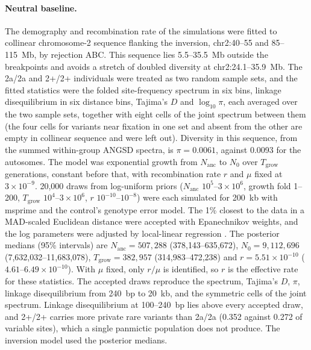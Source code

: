 \documentclass[11pt]{article}
\begin{document}
\paragraph{Neutral baseline.}
The demography and recombination rate of the simulations were fitted to collinear chromosome-2 sequence flanking the inversion, chr2:40--55 and 85--115~Mb, by rejection ABC. This sequence lies 5.5--35.5~Mb outside the breakpoints and avoids a stretch of doubled diversity at chr2:24.1--35.9~Mb. The 2a/2a and 2+/2+ individuals were treated as two random sample sets, and the fitted statistics were the folded site-frequency spectrum in six bins, linkage disequilibrium in six distance bins, Tajima's $D$ and $\log_{10}\pi$, each averaged over the two sample sets, together with eight cells of the joint spectrum between them (the four cells for variants near fixation in one set and absent from the other are empty in collinear sequence and were left out). Diversity in this sequence, from the summed within-group ANGSD spectra, is $\pi=0.0061$, against 0.0093 for the autosomes. The model was exponential growth from $N_\mathrm{anc}$ to $N_0$ over $T_\mathrm{grow}$ generations, constant before that, with recombination rate $r$ and $\mu$ fixed at $3\times10^{-9}$. 20{,}000 draws from log-uniform priors ($N_\mathrm{anc}$ $10^{5}$--$3\times10^{6}$, growth fold 1--200, $T_\mathrm{grow}$ $10^{4}$--$3\times10^{6}$, $r$ $10^{-10}$--$10^{-8}$) were each simulated for 200~kb with msprime and the control's genotype error model. The 1\% closest to the data in a MAD-scaled Euclidean distance were accepted with Epanechnikov weights, and the log parameters were adjusted by local-linear regression \citep{beaumont2002}. The posterior medians (95\% intervals) are $N_\mathrm{anc}=507{,}288$ (378{,}143--635{,}672), $N_0=9{,}112{,}696$ (7{,}632{,}032--11{,}683{,}078), $T_\mathrm{grow}=382{,}957$ (314{,}983--472{,}238) and $r=5.51\times10^{-10}$ ($4.61$--$6.49\times10^{-10}$). With $\mu$ fixed, only $r/\mu$ is identified, so $r$ is the effective rate for these statistics. The accepted draws reproduce the spectrum, Tajima's $D$, $\pi$, linkage disequilibrium from 240~bp to 20~kb, and the symmetric cells of the joint spectrum. Linkage disequilibrium at 100--240~bp lies above every accepted draw, and 2+/2+ carries more private rare variants than 2a/2a (0.352 against 0.272 of variable sites), which a single panmictic population does not produce. The inversion model used the posterior medians.
\end{document}
